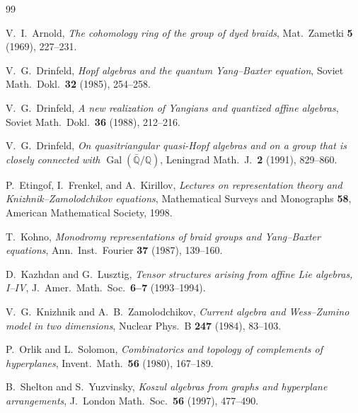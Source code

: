 \documentclass[11pt,reqno]{amsart}
\theoremstyle{definition}
\theoremstyle{remark}
\newcommand{\QQ}{\mathbb{Q}}
\numberwithin{equation}{section}
\begin{document}
\begin{thebibliography}{99}

V.~I.~Arnold,
\emph{The cohomology ring of the group of dyed braids},
Mat.\ Zametki \textbf{5} (1969), 227--231.

V.~G.~Drinfeld,
\emph{Hopf algebras and the quantum Yang--Baxter equation},
Soviet Math.\ Dokl.\ \textbf{32} (1985), 254--258.

V.~G.~Drinfeld,
\emph{A new realization of Yangians and quantized affine algebras},
Soviet Math.\ Dokl.\ \textbf{36} (1988), 212--216.

V.~G.~Drinfeld,
\emph{On quasitriangular quasi-Hopf algebras and on a
group that is closely connected with
$\operatorname{Gal}(\overline{\QQ}/\QQ)$},
Leningrad Math.\ J.\ \textbf{2} (1991), 829--860.

P.~Etingof, I.~Frenkel, and A.~Kirillov,
\emph{Lectures on representation theory and
Knizhnik--Zamolodchikov equations},
Mathematical Surveys and Monographs \textbf{58},
American Mathematical Society, 1998.

T.~Kohno,
\emph{Monodromy representations of braid groups and
Yang--Baxter equations},
Ann.\ Inst.\ Fourier \textbf{37} (1987), 139--160.

D.~Kazhdan and G.~Lusztig,
\emph{Tensor structures arising from affine Lie algebras,
I--IV},
J.~Amer.\ Math.\ Soc.\ \textbf{6--7} (1993--1994).

V.~G.~Knizhnik and A.~B.~Zamolodchikov,
\emph{Current algebra and Wess--Zumino model in two
dimensions},
Nuclear Phys.\ B \textbf{247} (1984), 83--103.

P.~Orlik and L.~Solomon,
\emph{Combinatorics and topology of complements of hyperplanes},
Invent.\ Math.\ \textbf{56} (1980), 167--189.

B.~Shelton and S.~Yuzvinsky,
\emph{Koszul algebras from graphs and hyperplane arrangements},
J.\ London Math.\ Soc.\ \textbf{56} (1997), 477--490.

\end{thebibliography}
\end{document}
